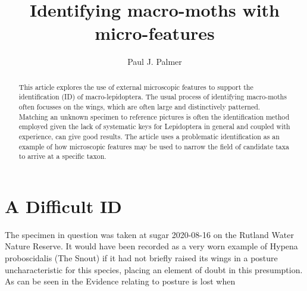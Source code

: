 \documentclass[]{article}
\title{Identifying macro-moths with micro-features}
\author{Paul J. Palmer}
\begin{document}
\maketitle

\begin{abstract}

This article explores the use of external microscopic features to support the identification (ID) of  macro-lepidoptera. The usual process of identifying macro-moths often focusses on the wings, which are often large and distinctively patterned. Matching an unknown specimen to reference pictures is often the identification method employed given the lack of systematic keys for Lepidoptera in general and coupled with experience, can give good results. The article uses a problematic identification as an example of how microscopic features may be used to narrow the field of candidate taxa to arrive at a specific taxon. 

\end{abstract}

\section*{A Difficult ID}
The specimen in question was taken at sugar 2020-08-16 on the Rutland Water Nature Reserve. It would have been recorded as a very worn example of Hypena proboscidalis (The Snout) if it had not briefly raised its wings in a posture uncharacteristic for this species, placing an element of doubt in this presumption. As can be seen in the  Evidence relating to posture is lost when
\end{document}
